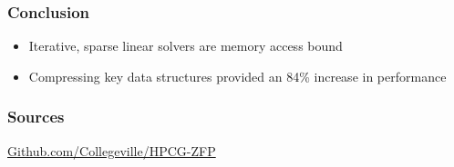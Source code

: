 \documentclass{beamer}
\begin{document}
\begin{frame}
	\frametitle{Conclusion}
	\begin{itemize}
		\item Iterative, sparse linear solvers are memory access bound
		\item Compressing key data structures provided an 84\% increase in performance
	\end{itemize}
\end{frame}

\begin{frame}
	\frametitle{Sources}
	\centering
	\url{Github.com/Collegeville/HPCG-ZFP}
\end{frame}
\end{document}
